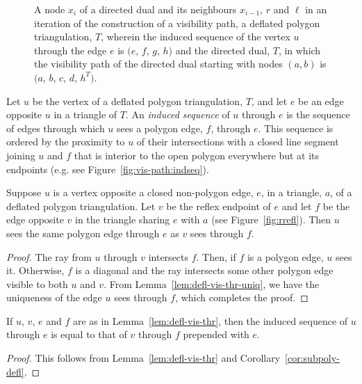 \documentclass{patmorin}
\begin{document}
\begin{figure}[htb]
  \centering
   \quad
   \quad
  \caption{\protect{} A node $x_i$ of a
    directed dual and its neighbours $x_{i-1}$, $r$ and $\ell$ in an
    iteration of the construction of a visibility
    path, \protect{} a deflated polygon
    triangulation, $T$, wherein the induced sequence of the vertex $u$
    through the edge $e$ is $(e$, $f$, $g$, $h)$
    and \protect{} the directed dual, $T$, in
    which the visibility path of the directed dual starting with nodes
    $(a,b)$ is $(a$, $b$, $c$, $d$, $h^T)$.}
  \label{fig:vis-path}
\end{figure}

Let $u$ be the vertex of a deflated polygon triangulation, $T$, and
let $e$ be an edge opposite $u$ in a triangle of $T$.
An \emph{induced sequence} of $u$ through $e$ is the sequence of edges
through which $u$ sees a polygon edge, $f$, through $e$.  This
sequence is ordered by the proximity to $u$ of their intersections
with a closed line segment joining $u$ and $f$ that is interior to the
open polygon everywhere but at its endpoints (e.g. see
Figure~\ref{fig:vis-path:indseq}).

\begin{lemma}
  \label{lem:defl-vis-thr}
  Suppose $u$ is a vertex opposite a closed non-polygon edge, $e$, in
  a triangle, $a$, of a deflated polygon triangulation.  Let $v$ be
  the reflex endpoint of $e$ and let $f$ be the edge opposite $v$ in
  the triangle sharing $e$ with $a$ (see Figure~\ref{fig:rrefl}).
  Then $u$ sees the same polygon edge through $e$ as $v$ sees through
  $f$.
\end{lemma}
\iffullversion
\begin{proof}
  The ray from $u$ through $v$ intersects $f$.  Then, if $f$ is a
  polygon edge, $u$ sees it.  Otherwise, $f$ is a diagonal and the ray
  intersects some other polygon edge visible to both $u$ and $v$.
  From Lemma~\ref{lem:defl-vis-thr-uniq}, we have the uniqueness of
  the edge $u$ sees through $f$, which completes the proof.
\end{proof}
\fi

\begin{cor}
  \label{cor:ind-path-rec}
  If $u$, $v$, $e$ and $f$ are as in Lemma~\ref{lem:defl-vis-thr},
  then the induced sequence of $u$ through $e$ is equal to that of $v$
  through $f$ prepended with $e$.
\end{cor}
\iffullversion
\begin{proof}
  This follows from Lemma~\ref{lem:defl-vis-thr} and
  Corollary~\ref{cor:subpoly-defl}.
\end{proof}
\fi
\end{document}
